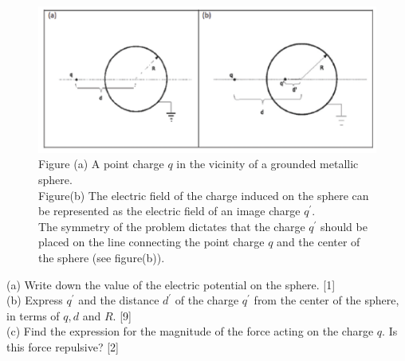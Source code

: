 \documentclass{article}
\begin{document}
\begin{figure}
	\centering
	\includegraphics[width=0.5\linewidth]{spho_book_TYS_images/2015q11.png}
	\caption{
		Figure (a) A point charge $q$ in the vicinity of a grounded metallic sphere. \\
		Figure(b) The electric field of the charge induced on the sphere can be represented as the electric field of an image charge $q^{\prime}$. \\
		The symmetry of the problem dictates that the charge $q^{\prime}$ should be placed on the line connecting the point charge $q$ and the center of the sphere (see figure(b)).
	}
\end{figure}
(a) Write down the value of the electric potential on the sphere. [1] \\
(b) Express $q^{\prime}$ and the distance $d^{\prime}$ of the charge $q^{\prime}$ from the center of the sphere, in terms of $q, d$ and $R$. [9] \\
(c) Find the expression for the magnitude of the force acting on the charge $q$. Is this force repulsive? [2]
\end{document}
